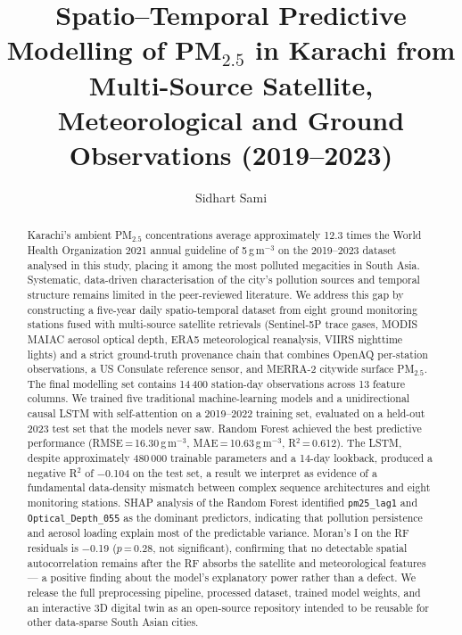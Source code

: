 \documentclass{iopjournal}
\begin{document}

\title{Spatio--Temporal Predictive Modelling of PM$_{2.5}$ in Karachi
from Multi-Source Satellite, Meteorological and Ground Observations
(2019--2023)}

\author{Sidhart Sami}




\begin{abstract}
Karachi's ambient PM$_{2.5}$ concentrations average approximately
12.3 times the World Health Organization 2021 annual guideline of
5\,\textmu g\,m$^{-3}$ on the 2019--2023 dataset analysed in this
study, placing it among the most polluted megacities in South Asia.
Systematic, data-driven characterisation of the city's pollution
sources and temporal structure remains limited in the peer-reviewed
literature. We address this gap by constructing a five-year daily
spatio-temporal dataset from eight ground monitoring stations fused
with multi-source satellite retrievals (Sentinel-5P trace gases,
MODIS MAIAC aerosol optical depth, ERA5 meteorological reanalysis,
VIIRS nighttime lights) and a strict ground-truth provenance chain
that combines OpenAQ per-station observations, a US Consulate
reference sensor, and MERRA-2 citywide surface PM$_{2.5}$. The final
modelling set contains 14\,400 station-day observations across 13
feature columns. We trained five traditional machine-learning models
and a unidirectional causal LSTM with self-attention on a 2019--2022
training set, evaluated on a held-out 2023 test set that the models
never saw. Random Forest achieved the best predictive performance
(RMSE\,=\,16.30\,\textmu g\,m$^{-3}$, MAE\,=\,10.63\,\textmu g\,m$^{-3}$,
R$^{2}$\,=\,0.612). The LSTM, despite approximately 480\,000 trainable
parameters and a 14-day lookback, produced a negative R$^{2}$ of
$-$0.104 on the test set, a result we interpret as evidence of a
fundamental data-density mismatch between complex sequence
architectures and eight monitoring stations. SHAP analysis of the
Random Forest identified \texttt{pm25\_lag1} and
\texttt{Optical\_Depth\_055} as the dominant predictors, indicating
that pollution persistence and aerosol loading explain most of the
predictable variance. Moran's I on the RF residuals is $-$0.19
($p$\,=\,0.28, not significant), confirming that no detectable
spatial autocorrelation remains after the RF absorbs the satellite
and meteorological features --- a positive finding about the model's
explanatory power rather than a defect. We release the full
preprocessing pipeline, processed dataset, trained model weights,
and an interactive 3D digital twin as an open-source repository
intended to be reusable for other data-sparse South Asian cities.
\end{abstract}
\end{document}
